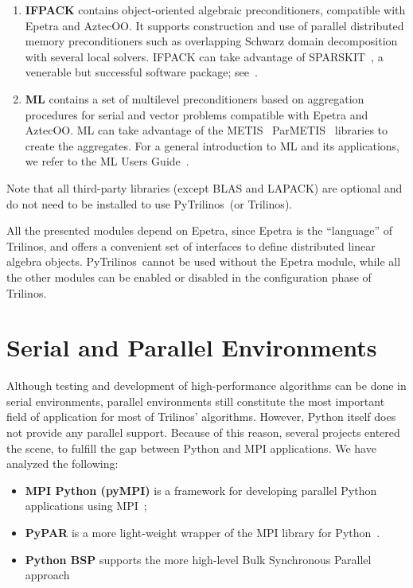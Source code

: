 \documentclass[10pt,relax]{SANDreport}
\newcommand{\PyTrilinos}{{PyTrilinos}}
\begin{document}
\begin{enumerate}
\item {\bf IFPACK} contains object-oriented algebraic preconditioners,
  compatible with Epetra and AztecOO.  It supports construction and
  use of parallel distributed memory preconditioners such as
  overlapping Schwarz domain decomposition with several local solvers.
  IFPACK can take advantage of SPARSKIT~\cite{sparskit}, a venerable
  but successful software package; see~\cite{ifpack-guide}.

\item {\bf ML} contains a set of multilevel preconditioners based on
  aggregation procedures for serial and vector problems compatible with Epetra
  and AztecOO. ML can take
  advantage of the METIS~\cite{metis} ParMETIS~\cite{parmetis}
  libraries to create the aggregates.  For a general introduction to
  ML and its applications, we refer to the ML Users
  Guide~\cite{ml-guide}.

\end{enumerate}

Note that all third-party libraries (except BLAS and LAPACK) are
optional and do not need to be installed to use \PyTrilinos\ (or
Trilinos). 

All the presented modules depend on Epetra, since Epetra is the ``language''
of Trilinos, and offers a convenient set of interfaces to define distributed
linear algebra objects.  \PyTrilinos\ cannot be used without the Epetra
module, while all the other modules can be enabled or disabled in the
configuration phase of Trilinos.

\section{Serial and Parallel Environments}
\label{sec:serial}

Although testing and development of high-performance algorithms can be done in
serial environments, parallel environments still constitute the most
important field of application for most of Trilinos' algorithms. However,
  Python itself does not provide any parallel support. Because of this reason,
  several projects entered the scene, to fulfill the gap between Python and
  MPI applications. We have analyzed the following:
\begin{itemize}
\item {\bf MPI Python (pyMPI)} is a framework for developing parallel Python
  applications using MPI~\cite{MPI-Python};
\item {\bf PyPAR} is a more light-weight wrapper of the MPI library
  for Python~\cite{pypar}.
\item {\bf Python BSP} supports the more high-level Bulk Synchronous
  Parallel approach~\cite{bsp}
\end{itemize}
\end{document}
